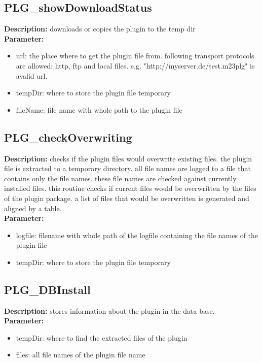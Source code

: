 \subsection{PLG\_showDownloadStatus}
\textbf{Description:} downloads or copies the plugin to the temp dir\\
\textbf{Parameter:}
\begin{itemize}
\item url: the place where to get the plugin file from. following transport protocols are allowed: http, ftp and local files. e.g. "http://myserver.de/test.m23plg" is avalid url.
\item tempDir: where to store the plugin file temporary
\item fileName: file name with whole path to the plugin file
\end{itemize}

\subsection{PLG\_checkOverwriting}
\textbf{Description:} checks if the plugin files would overwrite existing files. the plugin file is extracted to a temporary directory. all file names are logged to a file that contains only the file names. these file names are checked against currently installed files. this routine checks if current files would be overwritten by the files of the plugin package. a list of files that would be overwritten is generated and aligned by a table.\\
\textbf{Parameter:}
\begin{itemize}
\item logfile: filename with whole path of the logfile containing the file names of the plugin file
\item tempDir: where to store the plugin file temporary
\end{itemize}

\subsection{PLG\_DBInstall}
\textbf{Description:} stores information about the plugin in the data base.\\
\textbf{Parameter:}
\begin{itemize}
\item tempDir: where to find the extracted files of the plugin
\item files: all file names of the plugin file name
\end{itemize}

